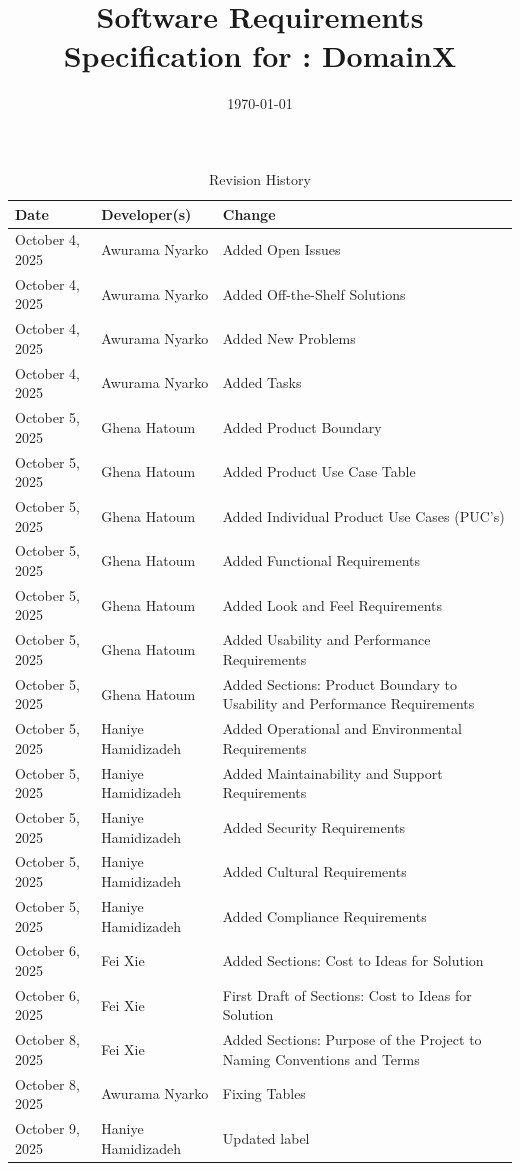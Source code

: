 \documentclass[12pt]{article}
\begin{document}
\title{Software Requirements Specification for \progname: DomainX} 
\author{\authname}
\date{\today}
	
\maketitle

\begin{table}[hp]
\caption{Revision History} \label{TblRevisionHistory}
\begin{tabularx}{\textwidth}{llX}
\toprule
\textbf{Date} & \textbf{Developer(s)} & \textbf{Change}\\
\midrule
October 4, 2025 & Awurama Nyarko & Added Open Issues\\
October 4, 2025 & Awurama Nyarko & Added Off-the-Shelf Solutions\\
October 4, 2025 & Awurama Nyarko & Added New Problems\\
October 4, 2025 & Awurama Nyarko & Added Tasks\\
October 5, 2025 & Ghena Hatoum & Added Product Boundary \\
October 5, 2025 & Ghena Hatoum & Added Product Use Case Table \\
October 5, 2025 & Ghena Hatoum & Added Individual Product Use Cases (PUC's) \\
October 5, 2025 & Ghena Hatoum & Added Functional Requirements \\
October 5, 2025 & Ghena Hatoum & Added Look and Feel Requirements \\
October 5, 2025 & Ghena Hatoum & Added Usability and Performance Requirements \\
October 5, 2025 & Ghena Hatoum & Added Sections: Product Boundary to Usability and Performance Requirements\\
October 5, 2025 & Haniye Hamidizadeh & Added Operational and Environmental Requirements \\
October 5, 2025 & Haniye Hamidizadeh & Added Maintainability and Support Requirements\\
October 5, 2025 & Haniye Hamidizadeh & Added Security Requirements\\
October 5, 2025 & Haniye Hamidizadeh & Added Cultural Requirements\\
October 5, 2025 & Haniye Hamidizadeh & Added Compliance Requirements\\
October 6, 2025 & Fei Xie & Added Sections: Cost to Ideas for Solution\\
October 6, 2025 & Fei Xie & First Draft of Sections: Cost to Ideas for Solution\\
October 8, 2025 & Fei Xie & Added Sections: Purpose of the Project to Naming Conventions and Terms\\
October 8, 2025 & Awurama Nyarko & Fixing Tables\\
October 9, 2025 & Haniye Hamidizadeh & Updated label\\
\bottomrule
\end{tabularx}
\end{table}
\end{document}
